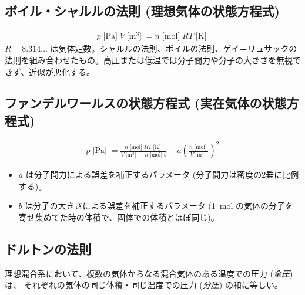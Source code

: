 \documentclass[a4paper,11pt]{jsarticle}
\newcommand{\braunit}[1]{\;\text{[}\unit{#1}\text{]}\;}
\begin{document}
\subsection*{ボイル・シャルルの法則 (理想気体の状態方程式)}
\begin{align*}
  p\braunit{\Pa}V\braunit{\m^3} = n\braunit{\mol}RT\braunit{\K}
\end{align*}
$R=8.314\dots$ は気体定数。シャルルの法則、ボイルの法則、ゲイ＝リュサックの法則を組み合わせたもの。高圧または低温では分子間力や分子の大きさを無視できず、近似が悪化する。
\cite[pp.15]{thermo}

\subsection*{ファンデルワールスの状態方程式 (実在気体の状態方程式)}
\begin{align*}
  p\braunit{\Pa} = \frac{n\braunit{\mol}RT\braunit{\K}}{V\braunit{\m^3} - n\braunit{\mol}b} - a\left(\frac{n\braunit{\mol}}{V\braunit{\m^3}}\right)^2
\end{align*}
\begin{itemize}
  \item $a$ は分子間力による誤差を補正するパラメータ (分子間力は密度の2乗に比例する)。
  \item $b$ は分子の大きさによる誤差を補正するパラメータ (\qty{1}{\mol} の気体の分子を寄せ集めてた時の体積で、固体での体積とほぼ同じ)。
\end{itemize}
\cite[pp.17]{thermo}

\subsection*{ドルトンの法則}
理想混合系において、複数の気体からなる混合気体のある温度での圧力 (\emph{全圧}) は、
それぞれの気体の同じ体積・同じ温度での圧力 (\emph{分圧}) の和に等しい。
\cite[pp.18]{thermo}



\end{document}
